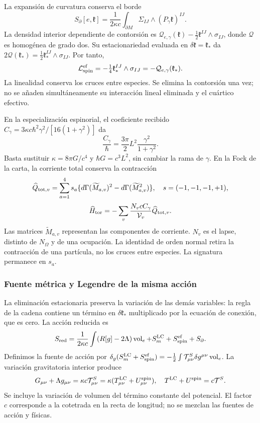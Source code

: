 La expansión de curvatura conserva el borde
\[
S_\partial[e,\mathfrak k]=\frac1{2\kappa c}
\int_{\partial M}\Sigma_{IJ}\wedge(P_\gamma\mathfrak k)^{IJ}.
\]
La densidad interior dependiente de contorsión es
$\mathcal Q_{e,\gamma}(\mathfrak k)
-\tfrac12\mathfrak k^{IJ}\wedge\sigma_{IJ}$,
donde $\mathcal Q$ es homogénea de grado dos.
Su estacionariedad evaluada en
$\delta\mathfrak k=\mathfrak k_*$ da
$2\mathcal Q(\mathfrak k_*)=
\tfrac12\mathfrak k_*^{IJ}\wedge\sigma_{IJ}$.
Por tanto,
\begin{equation}
\mathcal L_{\rm spin}^{\rm ef}
=-\tfrac14\mathfrak k_*^{IJ}\wedge\sigma_{IJ}
=-\mathcal Q_{e,\gamma}(\mathfrak k_*).
\label{hmtcuatro:gea:spin}
\end{equation}
La linealidad conserva los cruces entre especies.
Se elimina la contorsión una vez; no se añaden simultáneamente
su interacción lineal eliminada y el cuártico efectivo.

En la especialización espinorial, el coeficiente recibido
$C_\gamma=3\kappa c\hbar^2\gamma^2/[16(1+\gamma^2)]$ da
\begin{equation}
\frac{C_\gamma}{\hbar}
=\frac{3\pi}{2}L^2\frac{\gamma^2}{1+\gamma^2}.
\label{hmtcuatro:gea:coeficiente-torsion}
\end{equation}
Basta sustituir $\kappa=8\pi G/c^4$ y $\hbar G=c^3L^2$,
sin cambiar la rama de $\gamma$.
En la Fock de la carta, la corriente total conserva la contracción
\[
\widehat Q_{{\rm tot},v}=\sum_{a=1}^4s_a
\{d\Gamma(\widetilde M_{a,v})^2-d\Gamma(\widetilde M_{a,v}^2)\},
\quad s=(-1,-1,-1,+1),
\]
\[
\widehat H_{\rm tor}
=-\sum_v\frac{N_vcC_\gamma}{\mathcal V_v}\widehat Q_{{\rm tot},v}.
\]
Las matrices $\widetilde M_{a,v}$ representan las componentes
de corriente. $N_v$ es el lapse, distinto de $N_\Omega$ y de
una ocupación. La identidad de orden normal retira la contracción
de una partícula, no los cruces entre especies.
La signatura permanece en $s_a$.

\subsubsection{Fuente métrica y Legendre de la misma acción}
\label{hmtcuatro:gea:legendre}

La eliminación estacionaria preserva la variación de las demás
variables: la regla de la cadena contiene un término en
$\delta\mathfrak k_*$ multiplicado por la ecuación de conexión,
que es cero. La acción reducida es
\[
S_{\rm red}=\frac1{2\kappa c}\int(R[g]-2\Lambda)\operatorname{vol}_e
+S_m^{\rm LC}+S_{\rm spin}^{\rm ef}+S_\partial.
\]
Definimos la fuente de acción por
$\delta_g(S_m^{\rm LC}+S_{\rm spin}^{\rm ef})
=-\tfrac12\int\mathcal T^S_{\mu\nu}\delta g^{\mu\nu}
\operatorname{vol}_e$.
La variación gravitatoria interior produce
\begin{equation}
G_{\mu\nu}+\Lambda g_{\mu\nu}
=\kappa c\mathcal T^S_{\mu\nu}
=\kappa(T^{\rm LC}_{\mu\nu}+U^{\rm spin}_{\mu\nu}),
\quad T^{\rm LC}+U^{\rm spin}=c\mathcal T^S.
\label{hmtcuatro:gea:metrica}
\end{equation}
Se incluye la variación de volumen del término constante del
potencial. El factor $c$ corresponde a la cotetrada en la recta
de longitud; no se mezclan las fuentes de acción y físicas.

